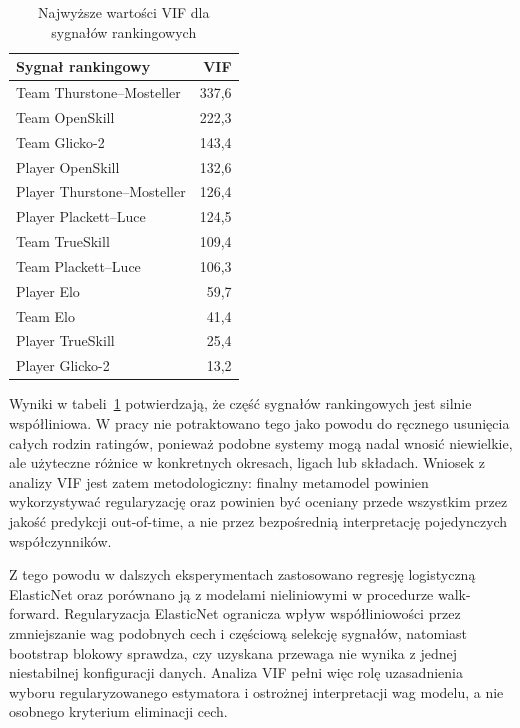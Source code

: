 \begin{table}[H]
    \centering
    \caption{Najwyższe wartości VIF dla sygnałów rankingowych}
    \label{tab:rating_signal_vif}
    \begin{tabular}{lr}
        \toprule
        Sygnał rankingowy & VIF \\
        \midrule
        Team Thurstone--Mosteller & 337{,}6 \\
        Team OpenSkill & 222{,}3 \\
        Team Glicko-2 & 143{,}4 \\
        Player OpenSkill & 132{,}6 \\
        Player Thurstone--Mosteller & 126{,}4 \\
        Player Plackett--Luce & 124{,}5 \\
        Team TrueSkill & 109{,}4 \\
        Team Plackett--Luce & 106{,}3 \\
        Player Elo & 59{,}7 \\
        Team Elo & 41{,}4 \\
        Player TrueSkill & 25{,}4 \\
        Player Glicko-2 & 13{,}2 \\
        \bottomrule
    \end{tabular}
\end{table}

Wyniki w tabeli~\ref{tab:rating_signal_vif} potwierdzają, że część sygnałów rankingowych jest silnie
współliniowa. W pracy nie potraktowano tego jako powodu do ręcznego usunięcia całych rodzin
ratingów, ponieważ podobne systemy mogą nadal wnosić niewielkie, ale użyteczne różnice w konkretnych
okresach, ligach lub składach. Wniosek z analizy VIF jest zatem metodologiczny: finalny metamodel
powinien wykorzystywać regularyzację oraz powinien być oceniany przede wszystkim przez jakość
predykcji out-of-time, a nie przez bezpośrednią interpretację pojedynczych współczynników.

Z tego powodu w dalszych eksperymentach zastosowano regresję logistyczną ElasticNet oraz porównano
ją z modelami nieliniowymi w procedurze walk-forward. Regularyzacja ElasticNet ogranicza wpływ
współliniowości przez zmniejszanie wag podobnych cech i częściową selekcję sygnałów, natomiast
bootstrap blokowy sprawdza, czy uzyskana przewaga nie wynika z jednej niestabilnej konfiguracji
danych. Analiza VIF pełni więc rolę uzasadnienia wyboru regularyzowanego estymatora i ostrożnej
interpretacji wag modelu, a nie osobnego kryterium eliminacji cech.

